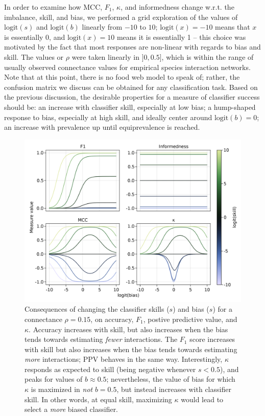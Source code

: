 \documentclass[11pt]{article}
\makeatletter
\def\maxwidth{\ifdim\Gin@nat@width>\linewidth\linewidth
\else\Gin@nat@width\fi}
\let\Oldincludegraphics\includegraphics
\renewcommand{\includegraphics}[1]{\Oldincludegraphics[width=\maxwidth]{#1}}
\makeatother
\begin{document}
In order to examine how MCC, \(F_1\), \(\kappa\), and informedness
change w.r.t. the imbalance, skill, and bias, we performed a grid
exploration of the values of \(\text{logit}(s)\) and \(\text{logit}(b)\)
linearly from \(-10\) to \(10\); \(\text{logit}(x) = -10\) means that
\(x\) is essentially 0, and \(\text{logit}(x) = 10\) means it is
essentially 1 -- this choice was motivated by the fact that most
responses are non-linear with regards to bias and skill. The values or
\(\rho\) were taken linearly in \(]0, 0.5]\), which is within the range
of usually observed connectance values for empirical species interaction
networks. Note that at this point, there is no food web model to speak
of; rather, the confusion matrix we discuss can be obtained for any
classification task. Based on the previous discussion, the desirable
properties for a measure of classifier success should be: an increase
with classifier skill, especially at low bias; a hump-shaped response to
bias, especially at high skill, and ideally center around
\(\text{logit}(b)=0\); an increase with prevalence up until
equiprevalence is reached.

\begin{figure}
\hypertarget{fig:bias}{%
\centering
\includegraphics{figures/changing-bias.png}
\caption{Consequences of changing the classifier skills (\(s\)) and bias
(\(s\)) for a connectance \(\rho=0.15\), on accuracy, \(F_1\), postive
predictive value, and \(\kappa\). Accuracy increases with skill, but
also increases when the bias tends towards estimating \emph{fewer}
interactions. The \(F_1\) score increases with skill but also increases
when the bias tends towards estimating \emph{more} interactions; PPV
behaves in the same way. Interestingly, \(\kappa\) responds as expected
to skill (being negative whenever \(s < 0.5\)), and peaks for values of
\(b \approx 0.5\); nevertheless, the value of bias for which \(\kappa\)
is maximized in \emph{not} \(b=0.5\), but instead increases with
classifier skill. In other words, at equal skill, maximizing \(\kappa\)
would lead to select a \emph{more} biased classifier.}\label{fig:bias}
}
\end{figure}
\end{document}
